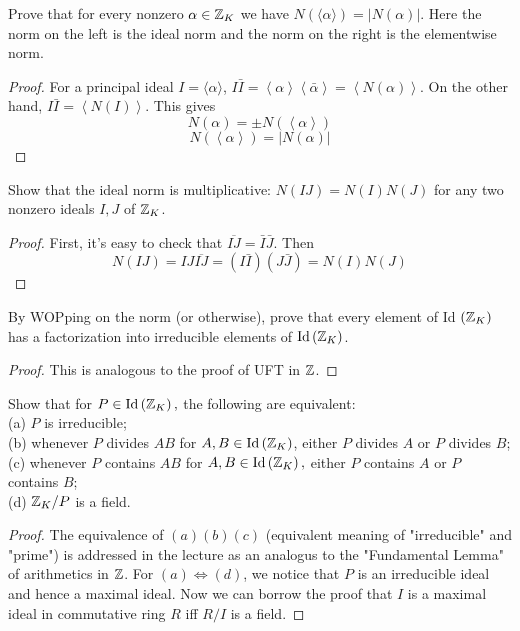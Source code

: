 \documentclass[12pt,twoside=semi,openright,numbers=noenddot]{scrbook}
\begin{document}
\begin{problem}
    Prove that for every nonzero $\alpha \in \mathbb Z_{K}$ we have $N(\langle\alpha\rangle)=|N(\alpha)|$. 
    Here the norm on the left is the ideal norm and the norm on the right is the elementwise norm.    
\end{problem}
    \begin{proof}
        For a principal ideal $I = \langle \alpha \rangle$, $I\bar{I} = \left\langle \alpha\right\rangle \left\langle \bar{\alpha}\right\rangle = \left\langle N(\alpha)\right\rangle$.
        On the other hand, $I\bar{I} = \left\langle N(I)\right\rangle$. This gives 
        $$ N(\alpha) = \pm N(\left\langle \alpha\right\rangle)$$
        $$ N(\left\langle \alpha\right\rangle) = \left\lvert N(\alpha)\right\rvert$$
    \end{proof}

\begin{problem}
    Show that the ideal norm is multiplicative: $N(I J)=N(I) N(J)$ for any two nonzero ideals $I, J$ of $\mathbb Z_{K}$.
\end{problem}
    \begin{proof}
        First, it's easy to check that $\overline{IJ} = \bar{I}\bar{J}$. Then 
        $$N(IJ) = IJ\overline{IJ} = (I\bar{I})(J\bar{J}) = N(I)N(J)$$
    \end{proof}

\begin{problem}
    By WOPping on the norm (or otherwise), prove that every element of Id $\left(\mathbb Z_{K}\right)$ 
    has a factorization into irreducible elements of $\operatorname{Id}\left(\mathbb Z_{K}\right)$.
\end{problem}
    \begin{proof}
        This is analogous to the proof of UFT in $\mathbb Z$.
    \end{proof}

\begin{problem}
    Show that for $P \in \operatorname{Id}\left(\mathbb Z_{K}\right),$ the following are equivalent: \\
    (a) $P$ is irreducible; \\
    (b) whenever $P$ divides $A B$ for $A, B \in \operatorname{Id}\left(\mathbb Z_{K}\right)$, either $P$ divides $A$ or $P$ divides $B$; \\
    (c) whenever $P$ contains $A B$ for $A, B \in \operatorname{Id}\left(\mathbb Z_{K}\right),$ either $P$ contains $A$ or $P$ contains $B$; \\
    (d) $\mathbb Z_{K} / P$ is a field.
\end{problem}
    \begin{proof}
        The equivalence of $(a)(b)(c)$ (equivalent meaning of "irreducible" and "prime") is addressed in the lecture 
        as an analogus to the "Fundamental Lemma" of arithmetics in $\mathbb Z$. For $(a)\Leftrightarrow(d)$, we notice that
        $P$ is an irreducible ideal and hence a maximal ideal. Now we can borrow the proof that $I$ is a maximal ideal in 
        commutative ring $R$ iff $R/I$ is a field.
    \end{proof}
\end{document}
